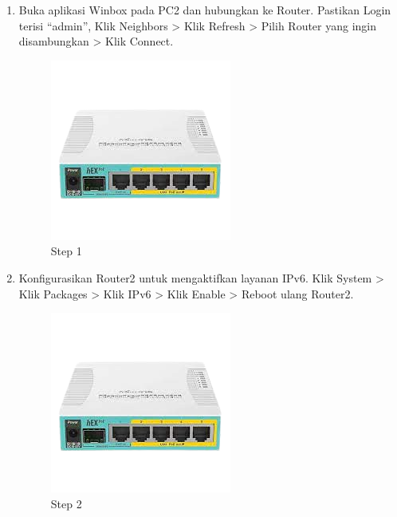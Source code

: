 \begin{enumerate}
	\item Buka aplikasi Winbox pada PC2 dan hubungkan ke Router. Pastikan Login terisi “admin”, Klik
	Neighbors > Klik Refresh > Pilih Router yang ingin disambungkan > Klik Connect.
	
	\begin{figure}[H]
		\centering
		\includegraphics[width=0.7\linewidth]{P1/img/contoh.png}
		\caption{Step 1}
		\label{fig:gambar1}
	\end{figure}

	\item Konfigurasikan Router2 untuk mengaktifkan layanan IPv6. Klik System > Klik Packages > Klik
	IPv6 > Klik Enable > Reboot ulang Router2.	
	
	\begin{figure}[H]
		\centering
		\includegraphics[width=0.7\linewidth]{P1/img/contoh.png}
		\caption{Step 2}
		\label{fig:gambar1}
	\end{figure}


\end{enumerate}
